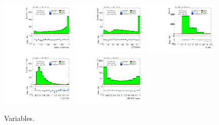 \begin{figure}[tp]
  \includegraphics[width=0.32\textwidth]{figures/analysis/vbf-QCDCR/lep-eta-centrality}
  \includegraphics[width=0.32\textwidth]{figures/analysis/vbf-QCDCR/system-pt}
  \includegraphics[width=0.32\textwidth]{figures/analysis/vbf-QCDCR/n-jets30}
  \includegraphics[width=0.32\textwidth]{figures/analysis/vbf-QCDCR/dijet-m-veryhigh}
  \includegraphics[width=0.32\textwidth]{figures/analysis/vbf-QCDCR/BDTEve-VBF}
  \caption{Variables.}
  \label{fig:backgrounds-QCDCR-jets}
\end{figure}

